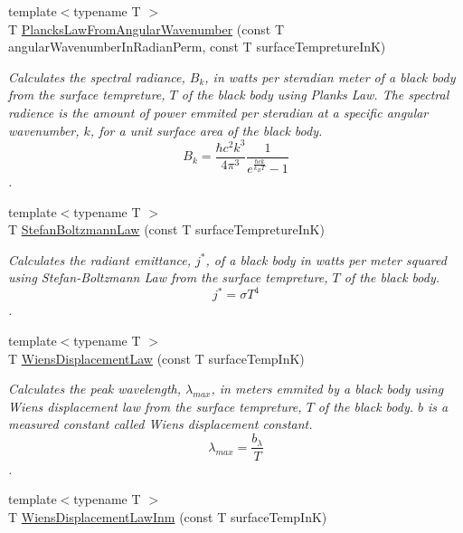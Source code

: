 \begin{DoxyCompactItemize}
{\footnotesize template$<$typename T $>$ }\\T \mbox{\hyperlink{group___e_g_x_phys-_electrodynamics-_black_body-_plancks_law_gaa3d3e0fdb77d25bdd40523f9975de902}{Plancks\+Law\+From\+Angular\+Wavenumber}} (const T angular\+Wavenumber\+In\+Radian\+Perm, const T surface\+Tempreture\+InK)
\begin{DoxyCompactList}\small\item\em Calculates the spectral radiance, $B_{k}$, in watts per steradian meter of a black body from the surface tempreture, $T$ of the black body using Plank\textquotesingle{}s Law. The spectral radience is the amount of power emmited per steradian at a specific angular wavenumber, $k$, for a unit surface area of the black body. \[ B_{k} = \dfrac{\hbar c^2 k^3}{4\pi^3} \dfrac{1}{e^{\frac{\hbar c k}{k_B T}} - 1} \]. \end{DoxyCompactList}\item 
{\footnotesize template$<$typename T $>$ }\\T \mbox{\hyperlink{group___e_g_x_phys-_electrodynamics-_black_body-_stefan_boltzmann_law_gadfc1c4242b5364a747169569ae5c84ef}{Stefan\+Boltzmann\+Law}} (const T surface\+Tempreture\+InK)
\begin{DoxyCompactList}\small\item\em Calculates the radiant emittance, $j^*$, of a black body in watts per meter squared using Stefan-\/\+Boltzmann Law from the surface tempreture, $T$ of the black body. \[j^*=\sigma T^4\]. \end{DoxyCompactList}\item 
{\footnotesize template$<$typename T $>$ }\\T \mbox{\hyperlink{group___e_g_x_phys-_electrodynamics-_black_body-_wiens_displacement_law_ga8f89ce1baac45a1717f604255d04af44}{Wiens\+Displacement\+Law}} (const T surface\+Temp\+InK)
\begin{DoxyCompactList}\small\item\em Calculates the peak wavelength, $\lambda_{max}$, in meters emmited by a black body using Wien\textquotesingle{}s displacement law from the surface tempreture, $T$ of the black body. $b$ is a measured constant called Wien\textquotesingle{}s displacement constant. \[\lambda_{max} = \dfrac{b_\lambda}{T} \]. \end{DoxyCompactList}\item 
{\footnotesize template$<$typename T $>$ }\\T \mbox{\hyperlink{group___e_g_x_phys-_electrodynamics-_black_body-_wiens_displacement_law_ga126ebb146c31a2371f1d1d001d11c62f}{Wiens\+Displacement\+Law\+Inm}} (const T surface\+Temp\+InK)

\end{DoxyCompactItemize}
